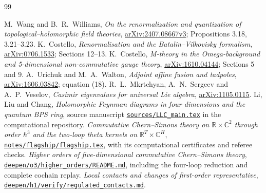 \documentclass[11pt,a4paper]{article}
\numberwithin{equation}{section}
\theoremstyle{definition}
\theoremstyle{remark}
\begin{document}









\begin{thebibliography}{99}
\raggedright
{}
M.~Wang and B.~R.~Williams,
\emph{On the renormalization and quantization of
topological--holomorphic field theories},
\href{https://arxiv.org/abs/2407.08667v3}{arXiv:2407.08667v3};
Propositions 3.18, 3.21--3.23.
K.~Costello,
\emph{Renormalisation and the Batalin--Vilkovisky formalism},
\href{https://arxiv.org/abs/0706.1533}{arXiv:0706.1533};
Sections 12--13.
K.~Costello,
\emph{M-theory in the Omega-background and 5-dimensional
non-commutative gauge theory},
\href{https://arxiv.org/abs/1610.04144}{arXiv:1610.04144};
Sections 5 and 9.
A.~Urichuk and M.~A.~Walton,
\emph{Adjoint affine fusion and tadpoles},
\href{https://arxiv.org/abs/1606.03842}{arXiv:1606.03842};
equation (18).
R.~L.~Mkrtchyan, A.~N.~Sergeev and A.~P.~Veselov,
\emph{Casimir eigenvalues for universal Lie algebra},
\href{https://arxiv.org/abs/1105.0115}{arXiv:1105.0115}.
Li, Liu and Chang,
\emph{Holomorphic Feynman diagrams in four dimensions and the
quantum BPS ring}, source manuscript
\href{https://github.com/lbotao399-stack/holomorphic-topological-feynman-diagrams/blob/b12b46ef484a1b002ddf92a8d776d44bab0a4f5c/sources/LLC_main.tex}{\texttt{sources/LLC\_main.tex}}
in the computational repository.
\emph{Commutative Chern--Simons theory on
$\mathbb R\times\mathbb C^2$ through order $\hbar^3$
and the two-loop theta kernels on
$\mathbb R^T\times\mathbb C^H$},
\href{https://github.com/lbotao399-stack/holomorphic-topological-feynman-diagrams/blob/b12b46ef484a1b002ddf92a8d776d44bab0a4f5c/notes/flagship/flagship.tex}{\texttt{notes/flagship/flagship.tex}},
with its computational certificates and referee checks.
\emph{Higher orders of five-dimensional commutative
Chern--Simons theory},
\href{https://github.com/lbotao399-stack/holomorphic-topological-feynman-diagrams/blob/b12b46ef484a1b002ddf92a8d776d44bab0a4f5c/deepen/o3/higher_orders/README.md}{\texttt{deepen/o3/higher\_orders/README.md}},
including the four-loop reduction and complete cochain replay.
\emph{Local contacts and changes of first-order representative},
\href{https://github.com/lbotao399-stack/holomorphic-topological-feynman-diagrams/blob/b12b46ef484a1b002ddf92a8d776d44bab0a4f5c/deepen/h1/verify/regulated_contacts.md}{\texttt{deepen/h1/verify/regulated\_contacts.md}}.
\end{thebibliography}
\end{document}
